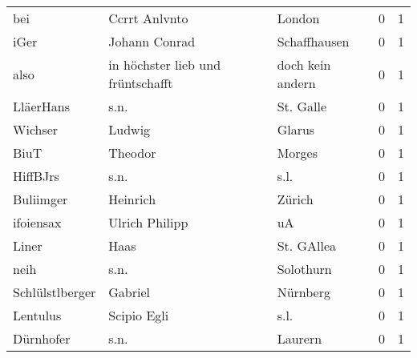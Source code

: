 \begin{center}
\begin{tiny}
\begin{longtabu}{llllrr}
                      bei &                      Ccrrt Anlvnto &             &                                      London &          0 &         1 \\
                     iGer &                      Johann Conrad &             &                                Schaffhausen &          0 &         1 \\
                     also &  in höchster lieb und früntschafft &             &                            doch kein andern &          0 &         1 \\
                LläerHans &                               s.n. &             &                                   St. Galle &          0 &         1 \\
                  Wichser &                             Ludwig &             &                                      Glarus &          0 &         1 \\
                     BiuT &                            Theodor &             &                                      Morges &          0 &         1 \\
                 HiffBJrs &                               s.n. &             &                                        s.l. &          0 &         1 \\
                Buliimger &                           Heinrich &             &                                      Zürich &          0 &         1 \\
                ifoiensax &                     Ulrich Philipp &             &                                          uA &          0 &         1 \\
                    Liner &                               Haas &             &                                  St. GAllea &          0 &         1 \\
                     neih &                               s.n. &             &                                   Solothurn &          0 &         1 \\
          Schlülstlberger &                            Gabriel &             &                                    Nürnberg &          0 &         1 \\
                 Lentulus &                        Scipio Egli &             &                                        s.l. &          0 &         1 \\
                Dürnhofer &                               s.n. &             &                                     Laurern &          0 &         1 \\

\end{longtabu}
\end{tiny}
\end{center}
